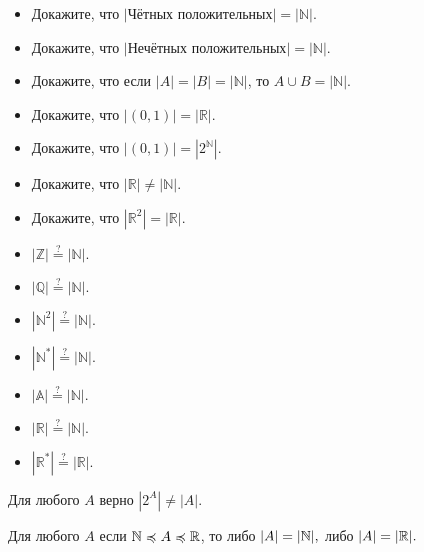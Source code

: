 \documentclass{article}
\begin{document}
    \begin{task_boxed}

        \begin{minipage}[c]{0.7\textwidth}
            \begin{itemize}
                \item Докажите, что $|$Чётных положительных$| = |\mathbb{N}|.$
                \item Докажите, что $|$Нечётных положительных$| = |\mathbb{N}|.$
                \item Докажите, что если $|A| = |B| = |\mathbb{N}|$, то $A\cup B = |\mathbb{N}|.$
                \item Докажите, что $|(0,1)| = |\mathbb{R}|.$
                \item Докажите, что $|(0,1)| = |2^{\mathbb{N}}|.$
                \item Докажите, что $|\mathbb{R}| \neq |\mathbb{N}|.$
                \item Докажите, что $|\mathbb{R}^2| = |\mathbb{R}|.$
            \end{itemize}
        \end{minipage}
        \begin{minipage}[c]{0.3\textwidth}
            \begin{itemize}
                \item $|\mathbb{Z}| \stackrel{?}{=} |\mathbb{N}|.$
                \item $|\mathbb{Q}| \stackrel{?}{=} |\mathbb{N}|.$
                \item $|\mathbb{N}^2| \stackrel{?}{=} |\mathbb{N}|.$
                \item $|\mathbb{N}^*| \stackrel{?}{=} |\mathbb{N}|.$
                \item $|\mathbb{A}| \stackrel{?}{=} |\mathbb{N}|.$
                \item $|\mathbb{R}| \stackrel{?}{=} |\mathbb{N}|.$
                \item $|\mathbb{R}^*| \stackrel{?}{=} |\mathbb{R}|.$
            \end{itemize}
        \end{minipage}
    \end{task_boxed}

    \begin{theorem_boxed}[ (Кантора)]
        Для любого $A$ верно $|2^A| \neq |A|.$
    \end{theorem_boxed}

    \begin{theorem_boxed}
        Для любого $A$ если $\mathbb{N} \preccurlyeq A \preccurlyeq \mathbb{R}$, то либо $|A| = |\mathbb{N}|,$ либо $|A| = |\mathbb{R}|.$
    \end{theorem_boxed}
\end{document}
